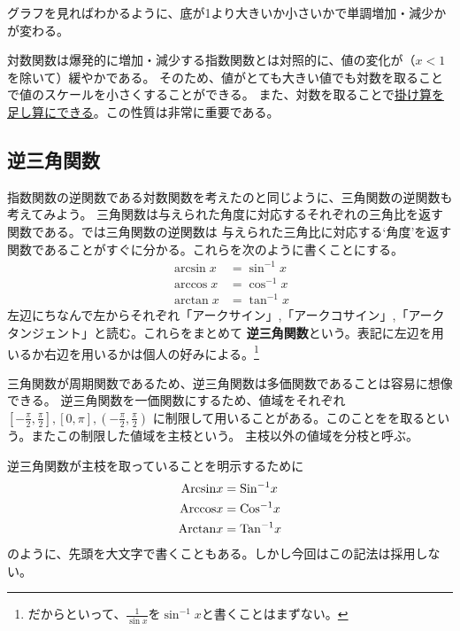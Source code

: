 \documentclass[a4j,dvipdfmx]{jsarticle}
\begin{document}
                グラフを見ればわかるように、底が1より大きいか小さいかで単調増加・減少かが変わる。

                対数関数は爆発的に増加・減少する指数関数とは対照的に、値の変化が（$x<1$を除いて）緩やかである。
                そのため、値がとても大きい値でも対数を取ることで値のスケールを小さくすることができる。
                また、対数を取ることで\underline{掛け算を足し算にできる}。この性質は非常に重要である。
            \clearpage
            \subsection{逆三角関数}
                指数関数の逆関数である対数関数を考えたのと同じように、三角関数の逆関数も考えてみよう。
                三角関数は与えられた角度に対応するそれぞれの三角比を返す関数である。では三角関数の逆関数は
                与えられた三角比に対応する`角度'を返す関数であることがすぐに分かる。これらを次のように書くことにする。
                \begin{align}
                    \arcsin x &= \sin^{-1} x \\
                    \arccos x &= \cos^{-1} x \\
                    \arctan x &= \tan^{-1} x
                \end{align}
                左辺にちなんで左からそれぞれ「アークサイン」,「アークコサイン」,「アークタンジェント」と読む。これらをまとめて
                \textbf{逆三角関数}という。表記に左辺を用いるか右辺を用いるかは個人の好みによる。\footnote{だからといって、$\frac{1}{\sin x}$を$\sin^{-1}x$と書くことはまずない。}

                三角関数が周期関数であるため、逆三角関数は多価関数であることは容易に想像できる。
                逆三角関数を一価関数にするため、値域をそれぞれ$[-\frac{\pi}{2},\frac{\pi}{2}],[0,\pi],(-\frac{\pi}{2},\frac{\pi}{2})$
                に制限して用いることがある。このことをを取るという。またこの制限した値域を主枝という。
                主枝以外の値域を分枝と呼ぶ。

                逆三角関数が主枝を取っていることを明示するために
                \begin{align}
                    {\rm Arcsin} x &= {\rm Sin^{-1}} x \\
                    {\rm Arccos} x &= {\rm Cos^{-1}} x \\
                    {\rm Arctan} x &= {\rm Tan^{-1}} x
                \end{align}
                のように、先頭を大文字で書くこともある。しかし今回はこの記法は採用しない。
\end{document}
